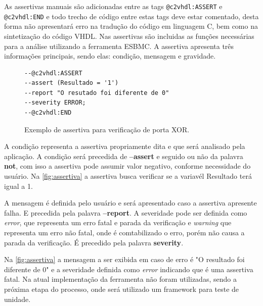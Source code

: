 \par
\label{sec:assertiva_descricao} As assertivas manuais são adicionadas entre as tags \texttt{@c2vhdl:ASSERT} e \texttt{@c2vhdl:END} e todo trecho de código entre estas tags deve estar comentado, desta forma não apresentará erro na tradução do código em linguagem C, bem como na sintetização do código VHDL. Nas assertivas são incluidas as funções necessárias para a análise utilizando a ferramenta ESBMC. A assertiva apresenta três informações principais, sendo elas: condição, mensagem e gravidade.

\begin{figure}[H]
\caption{\label{fig:assertiva} Exemplo de assertiva para verificação de porta XOR.}
	\begin{center}
    \begin{minipage}{0.99\textwidth}
    \begin{lstlisting}       
--@c2vhdl:ASSERT
--assert (Resultado = '1')
--report "O resutado foi diferente de 0"
--severity ERROR;
--@c2vhdl:END
    \end{lstlisting}
    \end{minipage}
	\end{center}
\end{figure}


\par
A condição representa a assertiva propriamente dita e que será analisado pela aplicação. A condição será precedida de \textbf{--assert} e seguido ou não da palavra \textbf{not}, com isso a assertiva pode assumir valor negativo, conforme necessidade do usuário. Na \autoref{fig:assertiva} a assertiva busca verificar se a variavél Resultado terá igual a 1. 

\par
A mensagem é definida pelo usuário e será apresentado caso a assertiva apresente falha. E precedida pela palavra \textbf{--report}. A severidade pode ser definida como \textit{error}, que representa um erro fatal e parada da verificação e \textit{warning} que representa um erro não fatal, onde é comtabilizado o erro, porém não causa a parada da verificação. É precedido pela palavra \textbf{severity}.

\par
Na \autoref{fig:assertiva} a mensagem a ser exibida em caso de erro é "O resultado foi diferente de 0" e a severidade definida como \textit{error} indicando que é uma assertiva fatal. Na atual implementação da ferramenta não foram utilizadas, sendo a próxima etapa do processo, onde será utilizado um framework para teste de unidade.

